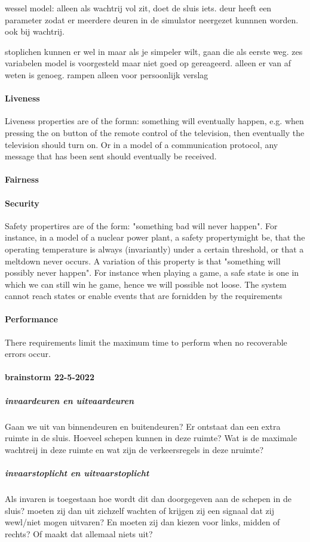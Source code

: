 {{{{{{{{{wessel model: alleen als wachtrij vol zit, doet de sluis iets.
deur heeft een parameter zodat er meerdere deuren in de simulator neergezet kunnnen worden. ook bij wachtrij.

stoplichen kunnen er wel in maar als je simpeler wilt, gaan die als eerste weg.
zes variabelen model is voorgesteld maar niet goed op gereageerd. alleen er van af weten is genoeg.
rampen alleen voor persoonlijk verslag

 


 

\paragraph{Liveness}
Liveness properties are of the formn: something will eventually happen, e.g. when pressing the on button of the remote control of the television, then eventually the television should turn on. Or in a model of a  communication protocol, any message that has been sent should eventually be received.
\paragraph{Fairness}
\paragraph{Security}
Safety propertires are of the form: "something bad will never happen". For instance, in a model of a nuclear power plant, a safety propertymight be, that the operating temperature is always (invariantly) under a certain threshold, or that a meltdown never occurs. A variation of this property is that "something will possibly never happen".
 For instance when playing a game, a safe state is one in which we can still win he game, hence we will possible not loose.
The system cannot reach states or enable events that are fornidden by the requirements
\paragraph{Performance}
There requirements limit the maximum time to perform when no recoverable errors occur.



\paragraph{brainstorm 22-5-2022}

\subparagraph{invaardeuren en uitvaardeuren}
Gaan we uit van binnendeuren en buitendeuren? Er ontstaat dan een extra ruimte in de sluis. Hoeveel schepen kunnen in deze ruimte? Wat is de maximale wachtreij in deze ruimte en wat zijn de verkeersregels in deze nruimte?
\subparagraph{invaarstoplicht en uitvaarstoplicht}
Als invaren is toegestaan hoe wordt dit dan doorgegeven aan de schepen in de sluis? moeten zij dan uit zichzelf wachten of krijgen zij een signaal dat zij wewl/niet mogen uitvaren? En moeten zij dan kiezen voor links, midden of rechts? Of maakt dat allemaal niets uit?

}}}}}}}}}
